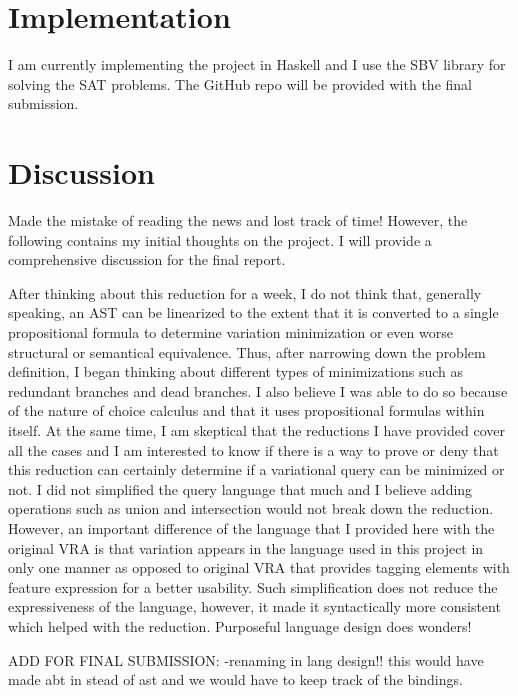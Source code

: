 \documentclass[12pt]{article}
\begin{document}
\section{Implementation}
\label{sec:impl}

I am currently implementing the project in Haskell and I use the SBV library for
solving the SAT problems. The GitHub repo will be provided with the final submission.

\section{Discussion}
\label{sec:disc}
Made the mistake of reading the news and lost track of time! However, the following contains 
my initial thoughts on the project. I will provide a comprehensive discussion for the final report. 

After thinking about this reduction for a week, I do not think that, generally speaking, an AST 
can be linearized to the extent that it is converted to a single propositional formula to determine
variation minimization or even worse structural or semantical equivalence. 
Thus, after narrowing down the problem definition, I began thinking about different types of minimizations
such as redundant branches and dead branches. I also believe I was able to do so because of the
nature of choice calculus and that it uses propositional formulas within itself. At the same time, I 
am skeptical that the reductions I have provided cover all the cases and I am interested to 
know if there is a way to prove or deny that this reduction can certainly determine if
a variational query can be minimized or not.
I did not simplified the query language that much and I believe adding operations such as 
union and intersection would not break down the reduction. However, an important difference
of the language that I provided here with the original VRA is that variation appears in the language
used in this project in only one manner as opposed to original VRA that provides tagging elements
with feature expression for a better usability. Such simplification does not reduce the expressiveness of the
language, however, it made it syntactically more consistent which helped with the reduction. Purposeful language design does wonders!

ADD FOR FINAL SUBMISSION:
-renaming in lang design!! this would have made abt in stead of ast and we would have to keep track of the bindings.



\end{document}
